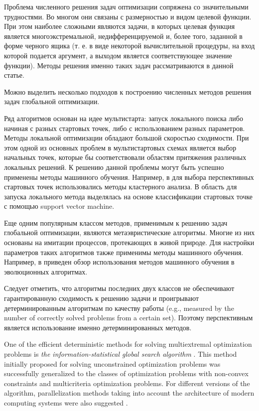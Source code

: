 \documentclass[entropy,article,submit,moreauthors,pdftex]{Definitions/mdpi}
\begin{document}
Проблема численного решения задач оптимизации сопряжена со значительными трудностями. Во многом они связаны с размерностью и видом целевой функции. При этом наиболее сложными являются задачи, в которых целевая функция является многоэкстремальной, недифференцируемой и, более того, заданной в форме черного ящика (т. е. в виде некоторой вычислительной процедуры, на вход которой подается аргумент, а выходом является соответствующее значение функции). Методы решения именно таких задач рассматриваются в данной статье. 

Можно выделить несколько подходов к построению численных методов решения задач глобальной оптимизации. 


Ряд алгоритмов основан на идее мультистарта: запуск локального поиска либо начиная с разных стартовых точек, либо с использованием разных параметров. Методы локальной оптимизации обладают большой скоростью сходимости. При этом одной из основных проблем в мультистартовых схемах является выбор начальных точек, которые бы соответствовали областям притяжения различных локальных решений. 
К решению данной проблемы могут быть успешно применены методы машинного обучения. 
Например, в \cite{RinnooyKan1987} для выбора перспективных стартовых точек использовались методы кластерного анализа. 
В \cite{Cassioli2012} область для запуска локального метода выделялась на основе классификации стартовых точке с помощью support vector machine.

Еще одним популярным классом методов, применимым к решению задач глобальной оптимизации, являются метаэвристические алгоритмы. 
Многие из них основаны на имитации процессов, протекающих в живой природе. Для настройки параметров таких алгоритмов также применимы методы машинного обучения. Например, в \cite{Jin2005} приведен обзор использования методов машинного обучения в эволюционных алгоритмах.

Следует отметить, что алгоритмы последних двух классов не обеспечивают гарантированную сходимость к решению задачи и проигрывают детерминированным алгоритмам по качеству работы \cite{Kvasov2018,Sergeyev2018} (e.g., measured by the number of correctly solved problems from a certain set). Поэтому перспективным является использование именно детерминированных методов.


One of the efficient deterministic methods for solving multiextremal optimization problems is \textit{the information-statistical global search algorithm} \cite{Strongin2000}. This method initially proposed for solving unconstrained optimization problems was successfully generalized to the classes of optimization problems with non-convex constraints and multicriteria optimization problems. For different versions of the algorithm, parallelization methods taking into account the architecture of modern computing systems were also suggested \cite{Barkalov2016,globalizerSystem,Strongin2018}.
\end{document}
